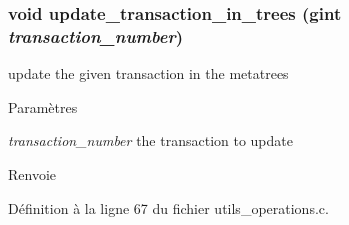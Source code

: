 \subsubsection[{update\_\-transaction\_\-in\_\-trees}]{\setlength{\rightskip}{0pt plus 5cm}void update\_\-transaction\_\-in\_\-trees (gint {\em transaction\_\-number})}\label{utils__operations_8h_a74b8b20760e6e001d3344a0c9fc2204a}
update the given transaction in the metatrees


\begin{DoxyParams}{Paramètres}
\item[{\em transaction\_\-number}]the transaction to update\end{DoxyParams}
\begin{DoxyReturn}{Renvoie}

\end{DoxyReturn}


Définition à la ligne 67 du fichier utils\_\-operations.c.

